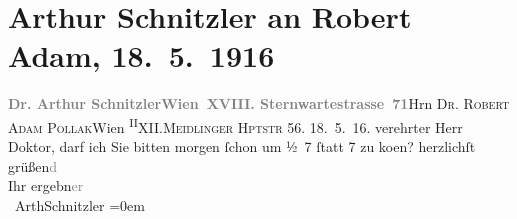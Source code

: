 

               \section[Arthur Schnitzler an Robert Adam, 18. 5. 1916]{ Arthur Schnitzler an Robert Adam, 18. 5. 1916}\nopagebreak{}\rehead{ }\begin{ledgroupsized}[t]{13cm}\normalsize\beginnumbering{} \toendnotes[C]{\smallbreak\pagebreak[2]} 
\pstart{}{\pb}\textcolor{gray}{\textbf{Dr. Arthur Schnitzler}}\pend{}\pstart{}\textcolor{gray}{\textbf{Wien XVIII. Sternwartestrasse 71}}\pend{}{\bigskip}\pstart{}Hrn \textsc{Dr. Robert Adam Pollak}\pend{}\pstart{}Wien \substVorne{}\textsuperscript{II}\substDazwischen{}X\substHinten{}II.\pend{}\pstart{}\textsc{Meidlinger Hptstr} 56.\pend{}{\bigskip}\pstart
           \raggedleft{}{\pb}18. 5. 16.\pend
           \pstart{}verehrter Herr Doktor,\pend\pstart
           darf ich Sie bitten morgen ſchon um ½ 7{ }ſtatt 7 zu ko{\geminationm}en?\pend
           \pstart
           herzlichſt grüßen\textcolor{gray}{d}{\\[\baselineskip]}Ihr ergebn\textcolor{gray}{er}{\\[\baselineskip]}\spacefill\mbox{ ArthSchnitzler}\pend
           \leftskip=0em{}          \endnumbering{}\end{ledgroupsized}  \newcommand{\dateiname}{L02228}\newcommand{\titel}{Arthur Schnitzler an Robert Adam, 18. 5. 1916}\newcommand{\editorInnen}{Martin Anton Müller und Gerd-Hermann Susen}
      
